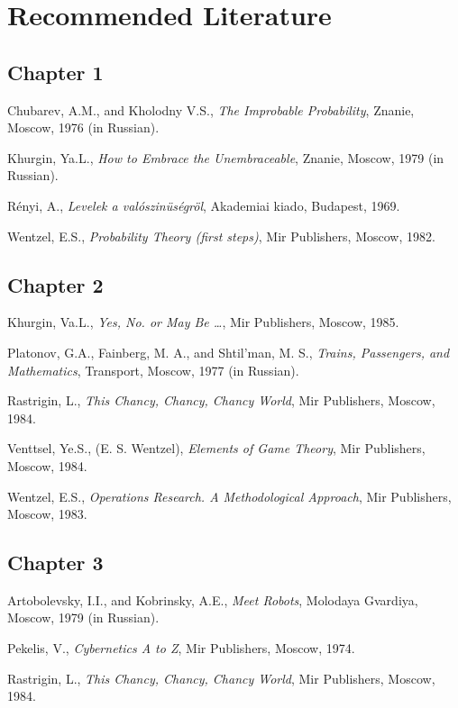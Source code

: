 
\chapter*{Recommended Literature}

{\small\parindent=0pt
\section*{Chapter 1}

Chubarev, A.M., and Kholodny V.S., \emph{The Improbable Probability}, Znanie, Moscow, 1976 (in Russian).

Khurgin, Ya.L., \emph{How to Embrace the Unembraceable}, Znanie, Moscow, 1979 (in Russian).

R\'enyi, A., \emph{Levelek a val\'oszin\"us\'egr\"ol}, Akademiai kiado, Budapest, 1969.

Wentzel, E.S., \emph{Probability Theory (first steps)}, Mir Publishers, Moscow, 1982.

\section*{Chapter 2}

Khurgin, Va.L., \emph{Yes, No. or May Be \ldots}, Mir Publishers, Moscow, 1985.

Platonov, G.A., Fainberg, M. A., and Shtil'man, M. S., \emph{Trains, Passengers, and Mathematics}, Transport, Moscow, 1977 (in Russian).

Rastrigin, L., \emph{This Chancy, Chancy, Chancy World}, Mir Publishers, Moscow, 1984.

Venttsel, Ye.S., (E. S. Wentzel), \emph{Elements of Game Theory}, Mir Publishers, Moscow, 1984.

Wentzel, E.S., \emph{Operations Research. A Methodological Approach}, Mir Publishers, Moscow, 1983.

\section*{Chapter 3}

Artobolevsky, I.I., and Kobrinsky, A.E., \emph{Meet Robots}, Molodaya Gvardiya, Moscow, 1979 (in Russian).

Pekelis, V., \emph{Cybernetics A to Z}, Mir Publishers, Moscow, 1974.

Rastrigin, L., \emph{This Chancy, Chancy, Chancy World}, Mir Publishers, Moscow, 1984.

}
